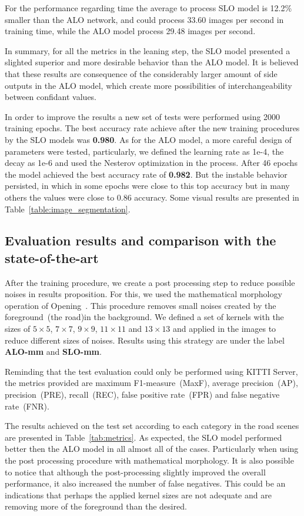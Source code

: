 For the performance regarding time the average to process SLO model is 12.2\% smaller than the ALO network, and could process 33.60 images per second in training time, while the ALO model process 29.48 images per second.

In summary, for all the metrics in the leaning step, the SLO model presented a slighted superior and more desirable behavior than the ALO model. It is believed that these results are consequence of the considerably larger amount of side outputs in the ALO model, which create more possibilities of interchangeability  between confidant values. 

In order to improve the results a new set of tests were performed using 2000 training epochs. The best accuracy rate achieve after the new  training procedures by the SLO models was \textbf{0.980}. As for the ALO model, a more careful design of parameters were tested, particularly, we defined the learning rate as 1e-4, the decay as 1e-6 and used the Nesterov optimization in the process. After 46 epochs the model achieved the best accuracy rate of \textbf{0.982}. But the instable behavior persisted, in which in some epochs were close to this top accuracy but in many others the values were close to 0.86 accuracy. Some visual results are presented in Table~\ref{table:image_segmentation}.

\subsection{Evaluation results and comparison with the state-of-the-art}

After the training procedure, we create a post processing step to reduce possible noises in results proposition. For this, we used the mathematical morphology operation of Opening~\cite{najman13}. This procedure removes small noises created by the foreground~(the road)in the background. We defined a set of kernels with the sizes of $5\times5$, $7\times7$, $9\times9$, $11\times11$ and $13\times13$ and applied in the images to reduce different sizes of noises. Results using this strategy are under the label \textbf{ALO-mm} and \textbf{SLO-mm}.

Reminding that the test evaluation could only be performed using KITTI Server, the metrics provided are maximum F1-measure~(MaxF), average precision~(AP), precision~(PRE), recall~(REC), false positive rate~(FPR) and false negative rate~(FNR). 

The results achieved  on the test set according to each category in the road scenes are presented in Table~\ref{tab:metrics}. As expected, the SLO model performed better then the ALO model in all almost all of the cases. Particularly when using the post processing procedure with mathematical morphology. It is also possible to notice that although the post-processing slightly improved the overall performance, it also increased the number of false negatives. This could be an indications that perhaps the applied kernel sizes are not adequate and are removing more of the foreground than the desired.   

